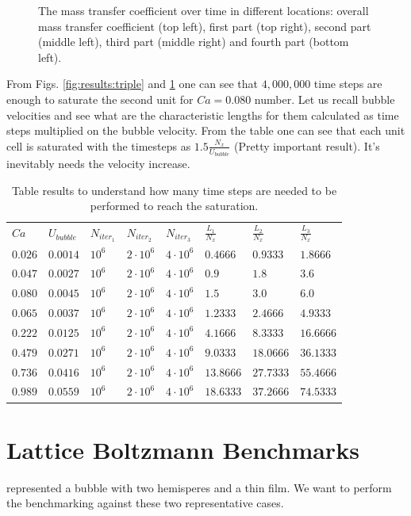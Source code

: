 \documentclass{article}
\begin{document}
\begin{figure}[htb!]
\caption{The mass transfer coefficient over time in different locations: overall mass transfer
coefficient (top left), first part (top right), second part (middle left), third part (middle
right) and fourth part (bottom left). \label{fig:results:quadro}}
\end{figure}

From Figs. \ref{fig:results:triple} and \ref{fig:results:quadro} one can see that $4,000,000$ time
steps are enough to saturate the second unit for $Ca=0.080$ number. Let us recall bubble velocities
and see what are the characteristic lengths for them calculated as time steps multiplied on the
bubble velocity. From the table one can see that each unit cell is saturated with the timesteps as
$1.5 \frac{N_x}{U_{bubble}}$ {\color{red}(Pretty important result)}. It's inevitably needs the
velocity increase.
\begin{table}[htb!]
\begin{tabularx}{\textwidth}{|X|X|X|X|X|X|X|X|}
\hline
$Ca$ &$U_{bubble}$ &$N_{iter_1}$ &$N_{iter_2}$ &$N_{iter_3}$ &$\frac{L_1}{N_x}$&$\frac{L_2}{N_x}$ 
&$\frac{L_3}{N_x}$\\
$0.026$&$0.0014$&$10^6$&$2\cdot10^6$&$4\cdot10^6$&$0.4666$ &$0.9333$ &$1.8666 $\\
$0.047$&$0.0027$&$10^6$&$2\cdot10^6$&$4\cdot10^6$&$0.9$    &$1.8$    &$3.6    $\\
$0.080$&$0.0045$&$10^6$&$2\cdot10^6$&$4\cdot10^6$&$1.5$    &$3.0$    &$6.0    $\\
$0.065$&$0.0037$&$10^6$&$2\cdot10^6$&$4\cdot10^6$&$1.2333$ &$2.4666$ &$4.9333 $\\
$0.222$&$0.0125$&$10^6$&$2\cdot10^6$&$4\cdot10^6$&$4.1666$ &$8.3333$ &$16.6666$\\
$0.479$&$0.0271$&$10^6$&$2\cdot10^6$&$4\cdot10^6$&$9.0333$ &$18.0666$&$36.1333$\\
$0.736$&$0.0416$&$10^6$&$2\cdot10^6$&$4\cdot10^6$&$13.8666$&$27.7333$&$55.4666$\\
$0.989$&$0.0559$&$10^6$&$2\cdot10^6$&$4\cdot10^6$&$18.6333$&$37.2666$&$74.5333$\\
\hline
\end{tabularx}
\caption{Table results to understand how many time steps are needed to be performed to reach the
saturation.\label{table:time:steps}}
\end{table}

\section{Lattice Boltzmann Benchmarks}
\citet{vanbaten-circular} represented a bubble with two hemisperes and a thin film. We want to
perform the benchmarking against these two representative cases.
\end{document}
